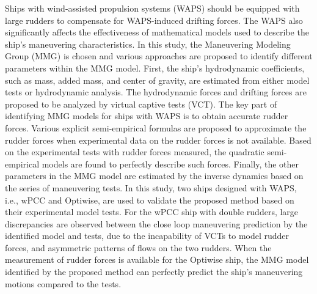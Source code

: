 Ships with wind-assisted propulsion systems (WAPS) should be equipped with large rudders to compensate for WAPS-induced drifting forces. The WAPS also significantly affects the effectiveness of mathematical models used to describe the ship's maneuvering characteristics. In this study, the Maneuvering Modeling Group (MMG) is chosen and various approaches are proposed to identify different parameters within the MMG model. First, the ship's hydrodynamic coefficients, such as mass, added mass, and center of gravity, are estimated from either model tests or hydrodynamic analysis. The hydrodynamic forces and drifting forces are proposed to be analyzed by virtual captive tests (VCT). The key part of identifying MMG models for ships with WAPS is to obtain accurate rudder forces. Various explicit semi-empirical formulas are proposed to approximate the rudder forces when experimental data on the rudder forces is not available. Based on the experimental tests with rudder forces measured, the quadratic semi-empirical models are found to perfectly describe such forces. Finally, the other parameters in the MMG model are estimated by the inverse dynamics based on the series of maneuvering tests. In this study, two ships designed with WAPS, i.e., wPCC and Optiwise, are used to validate the proposed method based on their experimental model tests. For the wPCC ship with double rudders, large discrepancies are observed between the close loop maneuvering prediction by the identified model and tests, due to the incapability of VCTs to model rudder forces, and asymmetric patterns of flows on the two rudders. When the measurement of rudder forces is available for the Optiwise ship, the MMG model identified by the proposed method can perfectly predict the ship’s maneuvering motions compared to the tests.




